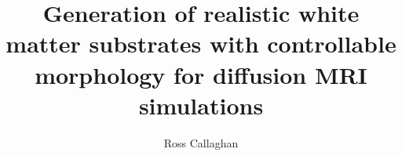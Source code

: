 

\graphicspath{ {src/} }






\newcommand{\titleinfo}{Generation of realistic white matter substrates with controllable morphology for diffusion MRI simulations}




\author{Ross Callaghan}
\title{\titleinfo}
\thesisdate{\today}

  {}{}
  {}{}
  {}{}




\maketitle
\pagestyle{empty}






